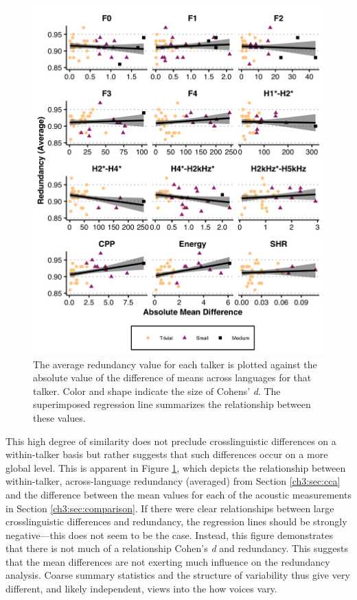 \begin{figure}[htbp]
    \begin{center}
    \includegraphics[width=0.85\linewidth]{figures/ch3_redundancybyttestdiff_5in.png} 
    \caption{The average redundancy value for each talker is plotted against the absolute value of the difference of means across languages for that talker. Color and shape indicate the size of Cohens' \textit{d}. The superimposed regression line summarizes the relationship between these values.}
    \label{ch3:fig:diffbyred}
    \end{center}
\end{figure}

This high degree of similarity does not preclude crosslinguistic differences on a within-talker basis but rather suggests that such differences occur on a more global level. This is apparent in Figure \ref{ch3:fig:diffbyred}, which depicts the relationship between within-talker, across-language redundancy (averaged) from Section \ref{ch3:sec:cca} and the difference between the mean values for each of the acoustic measurements in Section \ref{ch3:sec:comparison}. If there were clear relationships between large crosslinguistic differences and redundancy, the regression lines should be strongly negative---this does not seem to be the case. Instead, this figure demonstrates that there is not much of a relationship Cohen's \textit{d} and redundancy. This suggests that the mean differences are not exerting much influence on the redundancy analysis. Coarse summary statistics and the structure of variability thus give very different, and likely independent, views into the how voices vary.

